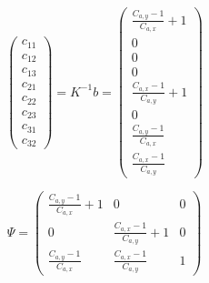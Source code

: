 $$
\begin{pmatrix}
		c_{11}\\
		c_{12}\\
		c_{13}\\
		c_{21}\\
		c_{22}\\
		c_{23}\\
		c_{31}\\
		c_{32}
\end{pmatrix}
= K^{-1} b =
\begin{pmatrix}
	\frac{C_{a,y}-1}{C_{a,x}} + 1\\
	0\\
	0\\
	0\\
	\frac{C_{a,x}-1}{C_{a,y}} + 1\\
	0\\
	\frac{C_{a,y}-1}{C_{a,x}}\\
	\frac{C_{a,x}-1}{C_{a,y}}
\end{pmatrix}
$$

$$
\Psi = 
\begin{pmatrix}
	\frac{C_{a,y}-1}{C_{a,x}} + 1 & 0 & 0 \\
	0 & \frac{C_{a,x}-1}{C_{a,y}}+1 & 0 \\
	\frac{C_{a,y}-1}{C_{a,x}} & \frac{C_{a,x}-1}{C_{a,y}} & 1
\end{pmatrix}
$$